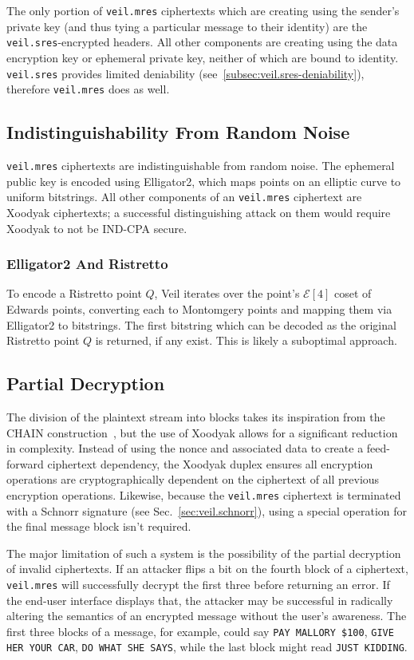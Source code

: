 The only portion of \texttt{veil.mres} ciphertexts which are creating using the sender's private key (and thus tying
a particular message to their identity) are the \texttt{veil.sres}-encrypted headers.
All other components are creating using the data encryption key or ephemeral private key, neither of which are bound
to identity.
\texttt{veil.sres} provides limited deniability (see~\ref{subsec:veil.sres-deniability}), therefore \texttt{veil.mres}
does as well.

\subsection{Indistinguishability From Random Noise}\label{subsec:veil.mres-indistinguishability}

\texttt{veil.mres} ciphertexts are indistinguishable from random noise.
The ephemeral public key is encoded using Elligator2, which maps points on an elliptic curve to uniform bitstrings.
All other components of an \texttt{veil.mres} ciphertext are Xoodyak ciphertexts;
a successful distinguishing attack on them would require Xoodyak to not be IND-CPA secure.

\subsubsection{Elligator2 And Ristretto}

To encode a Ristretto point $Q$, Veil iterates over the point's $\mathcal E[4]$ coset of Edwards points, converting each
to Montomgery points and mapping them via Elligator2 to bitstrings.
The first bitstring which can be decoded as the original Ristretto point $Q$ is returned, if any exist.
This is likely a suboptimal approach.

\subsection{Partial Decryption}\label{subsec:veil.mres-partial-decryption}

The division of the plaintext stream into blocks takes its inspiration from the CHAIN construction~\cite{hoang2015}, but
the use of Xoodyak allows for a significant reduction in complexity.
Instead of using the nonce and associated data to create a feed-forward ciphertext dependency, the Xoodyak duplex
ensures all encryption operations are cryptographically dependent on the ciphertext of all previous encryption
operations.
Likewise, because the \texttt{veil.mres} ciphertext is terminated with a Schnorr signature (see
Sec.~\ref{sec:veil.schnorr}), using a special operation for the final message block isn't required.

The major limitation of such a system is the possibility of the partial decryption of invalid ciphertexts.
If an attacker flips a bit on the fourth block of a ciphertext, \texttt{veil.mres} will successfully decrypt the first
three before returning an error.
If the end-user interface displays that, the attacker may be successful in radically altering the semantics of an
encrypted message without the user's awareness.
The first three blocks of a message, for example, could say \texttt{PAY MALLORY \$100}, \texttt{GIVE HER YOUR CAR},
\texttt{DO WHAT SHE SAYS}, while the last block might read \texttt{JUST KIDDING}.
